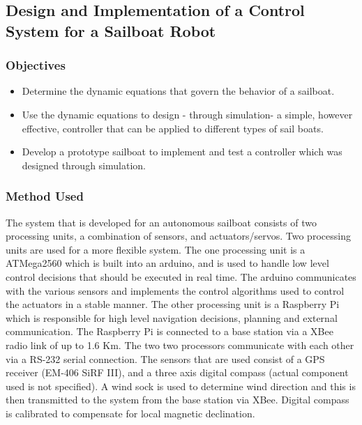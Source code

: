 \subsection{Design and Implementation of a Control System for a
Sailboat Robot}

\subsubsection{Objectives}
\begin{itemize}
    \item Determine the dynamic equations that govern the behavior of a sailboat.
    \item Use the dynamic equations to design - through simulation- a simple, however effective, controller that can be applied to different types of sail boats.
    \item Develop a prototype sailboat to implement and test a controller which was designed through simulation.
\end{itemize}

\subsubsection{Method Used}

The system that is developed for an autonomous sailboat consists of two processing units, a combination of sensors, and actuators/servos. Two processing units are used for a more 
flexible system. The one processing unit is a ATMega2560 which is built into an arduino, and is used to handle low level control decisions that should be executed in real time. 
The arduino communicates with the various sensors and implements the control algorithms used to control the actuators in a stable manner. The other processing unit is a Raspberry 
Pi which is responsible for high level navigation decisions, planning and external communication. The Raspberry Pi is connected to a base station via a XBee radio link of up to 1.6 Km. 
The two two processors communicate with each other via a RS-232 serial connection. The sensors that are used consist of a GPS receiver (EM-406 SiRF III), and a three axis digital compass 
(actual component used is not specified). A wind sock is used to determine wind direction and this is then transmitted to the system from the base station via XBee. Digital compass
is calibrated to compensate for local magnetic declination. 


